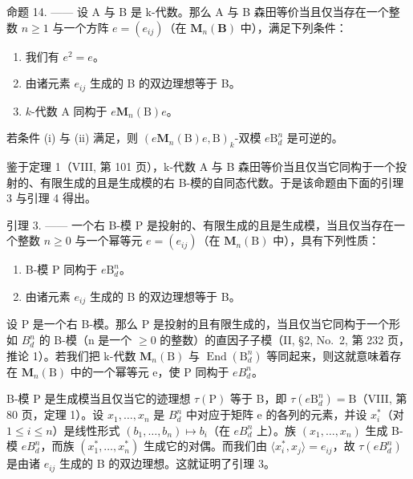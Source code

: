 命题 14. —— 设 A 与 B 是 k-代数。那么 A 与 B 森田等价当且仅当存在一个整数 \(n \geqslant 1\) 与一个方阵 \(e = (e_{ij})\)（在 \(\mathbf{M}_{n}(\mathbf{B})\) 中），满足下列条件：

\begin{enumerate}
\def\labelenumi{(\roman{enumi})}
\item
  我们有 \(e^2 = e\)。
\item
  由诸元素 \(e_{ij}\) 生成的 B 的双边理想等于 B。
\item
  \(k\)-代数 A 同构于 \(e\mathbf{M}_n(\mathrm{B})e\)。
\end{enumerate}

若条件 (i) 与 (ii) 满足，则 \((e\mathbf{M}_n(\mathrm{B})e,\mathrm{B})_k\)-双模 \(e\mathrm{B}_d^n\) 是可逆的。

鉴于定理 1（VIII, 第 101 页），k-代数 A 与 B 森田等价当且仅当它同构于一个投射的、有限生成的且是生成模的右 B-模的自同态代数。于是该命题由下面的引理 3 与引理 4 得出。

引理 3. —— 一个右 B-模 P 是投射的、有限生成的且是生成模，当且仅当存在一个整数 \(n \geqslant 0\) 与一个幂等元 \(e = (e_{ij})\)（在 \(\mathbf{M}_n(\mathrm{B})\) 中），具有下列性质：

\begin{enumerate}
\def\labelenumi{(\roman{enumi})}
\item
  B-模 P 同构于 \(e\mathrm{B}_d^n\)。
\item
  由诸元素 \(e_{ij}\) 生成的 B 的双边理想等于 B。
\end{enumerate}

设 P 是一个右 B-模。那么 P 是投射的且有限生成的，当且仅当它同构于一个形如 \(B_{d}^{n}\) 的 B-模（n 是一个 \(\geqslant 0\) 的整数）的直因子子模（II, §2, No.~2, 第 232 页，推论 1）。若我们把 k-代数 \(\mathbf{M}_{n}(\mathrm{B})\) 与 \(\operatorname{End}(\mathrm{B}_{d}^{n})\) 等同起来，则这就意味着存在 \(\mathbf{M}_{n}(\mathrm{B})\) 中的一个幂等元 e，使 P 同构于 \(eB_{d}^{n}\)。

B-模 P 是生成模当且仅当它的迹理想 \(\tau(\mathrm{P})\) 等于 B，即 \(\tau(e\mathrm{B}_{d}^{n})=\mathrm{B}\)（VIII, 第 80 页，定理 1）。设 \(x_{1},\ldots,x_{n}\) 是 \(B_{d}^{n}\) 中对应于矩阵 e 的各列的元素，并设 \(x_{i}^{*}\)（对 \(1\leqslant i\leqslant n\)）是线性形式 \((b_{1},\ldots,b_{n})\mapsto b_{i}\)（在 \(eB_{d}^{n}\) 上）。族 \((x_{1},\ldots,x_{n})\) 生成 B-模 \(eB_{d}^{n}\)，而族 \((x_{1}^{*},\ldots,x_{n}^{*})\) 生成它的对偶。而我们由 \(\langle x_{i}^{*},x_{j}\rangle=e_{ij}\)，故 \(\tau(eB_{d}^{n})\) 是由诸 \(e_{ij}\) 生成的 B 的双边理想。这就证明了引理 3。


